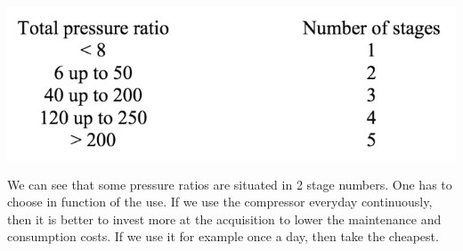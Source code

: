 \begin{center}
\includegraphics[scale=0.5]{ch5/22}
\end{center}

We can see that some pressure ratios are situated in 2 stage numbers. One has to choose in function of the use. If we use the compressor everyday continuously, then it is better to invest more at the acquisition to lower the maintenance and consumption costs. If we use it for example once a day, then take the cheapest. 